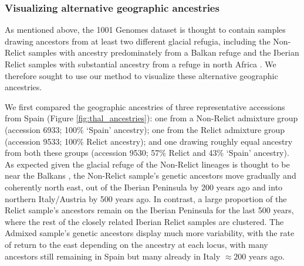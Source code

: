 \documentclass[12pt]{article}
\begin{document}
\subsubsection*{Visualizing alternative geographic ancestries}

As mentioned above, the 1001 Genomes dataset is thought to contain samples drawing ancestors from at least two different glacial refugia, including the Non-Relict samples with ancestry predominately from a Balkan refuge \citep{lee2017post} and the Iberian Relict samples with substantial ancestry from a refuge in north Africa \citep{alonso2016,durvasula2017african,fulgione2018madeiran}.
We therefore sought to use our method to visualize these alternative geographic ancestries.

We first compared the geographic ancestries of three representative accessions from Spain (Figure \ref{fig:thal_ancestries}): one from a Non-Relict admixture group (accession 6933; 100\% `Spain' ancestry); one from the Relict admixture group (accession 9533; 100\% Relict ancestry); and one drawing roughly equal ancestry from both these groups (accession 9530; 57\% Relict and 43\% `Spain' ancestry).
As expected given the glacial refuge of the Non-Relict lineages is thought to be near the Balkans \citep{lee2017post}, the Non-Relict sample's genetic ancestors move gradually and coherently north east, out of the Iberian Peninsula by 200 years ago and into northern Italy/Austria by 500 years ago. 
In contrast, a large proportion of the Relict sample's ancestors remain on the Iberian Peninsula for the last 500 years, where the rest of the closely related Iberian Relict samples are clustered.
The Admixed sample's genetic ancestors display much more variability, with the rate of return to the east depending on the ancestry at each locus, with many ancestors still remaining in Spain but many already in Italy $\approx200$ years ago. 

\end{document}
